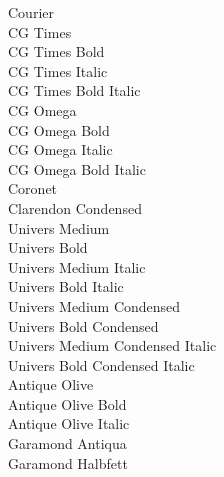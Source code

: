 \documentclass[12pt]{article}
\begin{document}
\pagestyle{empty}
\renewcommand{\baselinestretch}{1.5}
\noindent{} Courier\\
 CG Times\\
 CG Times Bold\\
 CG Times Italic\\
 CG Times Bold Italic\\
 CG Omega\\
 CG Omega Bold\\
 CG Omega Italic\\
 CG Omega Bold Italic\\
 Coronet\\
 Clarendon Condensed\\
 Univers Medium\\
 Univers Bold\\
 Univers Medium Italic\\
 Univers Bold Italic\\
 Univers Medium Condensed\\
 Univers Bold Condensed\\
 Univers Medium Condensed Italic\\
 Univers Bold Condensed Italic\\
 Antique Olive\\
 Antique Olive Bold\\
 Antique Olive Italic\\
 Garamond Antiqua\\
 Garamond Halbfett
\pagebreak
\end{document}

